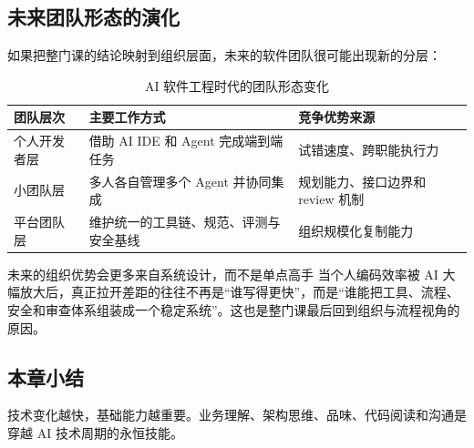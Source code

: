 \subsection{未来团队形态的演化}

如果把整门课的结论映射到组织层面，未来的软件团队很可能出现新的分层：

\begin{table}[H]
\centering
\begin{tabular}{p{} p{} p{}}
\toprule
团队层次 & 主要工作方式 & 竞争优势来源 \\
\midrule
个人开发者层 & 借助 AI IDE 和 Agent 完成端到端任务 & 试错速度、跨职能执行力 \\
小团队层 & 多人各自管理多个 Agent 并协同集成 & 规划能力、接口边界和 review 机制 \\
平台团队层 & 维护统一的工具链、规范、评测与安全基线 & 组织规模化复制能力 \\
\bottomrule
\end{tabular}
\caption{AI 软件工程时代的团队形态变化}
\end{table}

\begin{knowledgebox}{未来的组织优势会更多来自系统设计，而不是单点高手}
当个人编码效率被 AI 大幅放大后，真正拉开差距的往往不再是“谁写得更快”，而是“谁能把工具、流程、安全和审查体系组装成一个稳定系统”。这也是整门课最后回到组织与流程视角的原因。
\end{knowledgebox}

\subsection{本章小结}

技术变化越快，基础能力越重要。业务理解、架构思维、品味、代码阅读和沟通是穿越 AI 技术周期的永恒技能。


